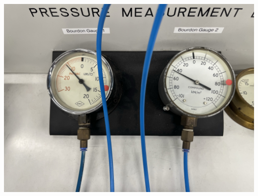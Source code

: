 \documentclass{article}
\begin{document}
	\begin{minipage}{0.45\textwidth}\centering
		\begin{center}
			\begin{minipage}{0.45\textwidth}\centering
				\includegraphics[width=1.2\textwidth]{images/Image(1).jpg}\\[0.5em]

\end{minipage}
\end{center}
\end{minipage}
\end{document}
